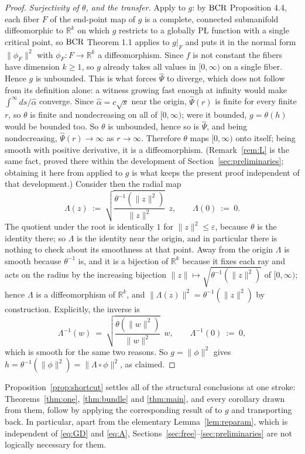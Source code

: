 \documentclass[11pt]{article}
\theoremstyle{plain}
\theoremstyle{definition}
\theoremstyle{remark}
\newcommand{\R}{\mathbb{R}}
\newcommand{\bcr}{\textup{BCR}}
\begin{document}
\begin{proof}
\emph{Surjectivity of $\theta$, and the transfer.} Apply \cite{BCR2026} to $g$:
by $\bcr$ Proposition 4.4, each fiber $F$ of the end-point map of $g$ is a
complete, connected submanifold diffeomorphic to $\R^k$ on which $g$ restricts to
a globally P\L{} function with a single critical point, so $\bcr$ Theorem 1.1
applies to $g|_F$ and puts it in the normal form $\|\phi_F\|^2$ with
$\phi_F\colon F\to\R^k$ a diffeomorphism. Since $f$ is not constant the fibers
have dimension $k\ge1$, so $g$ already takes all values in $[0,\infty)$ on a
single fiber. Hence $g$ is unbounded. This is what forces $\hat\Psi$ to diverge,
which does not follow from its definition alone: a witness growing fast enough at
infinity would make $\int^\infty ds/\hat\alpha$ converge. Since
$\hat\alpha = c\sqrt s$ near the origin, $\hat\Psi(r)$ is finite for every finite
$r$, so $\theta$ is finite and nondecreasing on all of $[0,\infty)$; were it
bounded, $g=\theta(h)$ would be bounded too. So $\theta$ is unbounded, hence so is
$\hat\Psi$, and being nondecreasing, $\hat\Psi(r)\to\infty$ as $r\to\infty$.
Therefore $\theta$ maps $[0,\infty)$ onto itself; being smooth
with positive derivative, it is a diffeomorphism. (Remark~\ref{rem:L} is the same
fact, proved there within the development of Section~\ref{sec:preliminaries};
obtaining it here from \cite{BCR2026} applied to $g$ is what keeps the present
proof independent of that development.) Consider then the radial map
\[
  \Lambda(z) \ :=\ \sqrt{\frac{\theta^{-1}(\|z\|^2)}{\|z\|^2}}\;\,z ,
  \qquad \Lambda(0) \ :=\ 0 .
\]
The quotient under the root is identically $1$ for $\|z\|^2\le\varepsilon$, because
$\theta$ is the identity there; so $\Lambda$ is the identity near the origin, and in
particular there is nothing to check about its smoothness at that point. Away from
the origin $\Lambda$ is smooth because $\theta^{-1}$ is, and it is a bijection of
$\R^k$ because it fixes each ray and acts on the radius by the increasing bijection
$\|z\|\mapsto\sqrt{\theta^{-1}(\|z\|^2)}$ of $[0,\infty)$; hence $\Lambda$ is a
diffeomorphism of $\R^k$, and $\|\Lambda(z)\|^2 = \theta^{-1}(\|z\|^2)$ by
construction. Explicitly, the inverse is
\[
  \Lambda^{-1}(w) \ =\ \sqrt{\frac{\theta(\|w\|^2)}{\|w\|^2}}\;\,w ,
  \qquad \Lambda^{-1}(0) \ :=\ 0 ,
\]
which is smooth for the same two reasons. So $g=\|\phi\|^2$ gives
$h = \theta^{-1}(\|\phi\|^2) = \|\Lambda\circ\phi\|^2$, as claimed.
\end{proof}

Proposition~\ref{prop:shortcut} settles all of the structural conclusions at one
stroke: Theorems~\ref{thm:one}, \ref{thm:bundle} and \ref{thm:main}, and every
corollary drawn from them, follow by applying the corresponding result of
\cite{BCR2026} to $g$ and transporting back. In particular, apart from the
elementary Lemma~\ref{lem:reparam}, which is independent of \eqref{eq:GD} and
\eqref{eq:A}, Sections~\ref{sec:free}--\ref{sec:preliminaries} are not logically
necessary for them.
\end{document}
